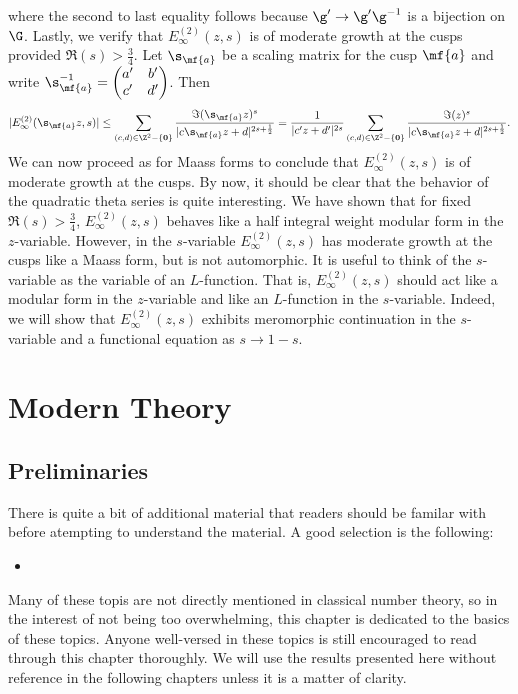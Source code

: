       where the second to last equality follows because $\g' \to \g'\g^{-1}$ is a bijection on $\G$. Lastly, we verify that $E_{\infty}^{(2)}(z,s)$ is of moderate growth at the cusps provided $\Re(s) > \frac{3}{4}$. Let $\s_{\mf{a}}$ be a scaling matrix for the cusp $\mf{a}$ and write $\s_{\mf{a}}^{-1} = \begin{pmatrix} a' & b' \\ c' & d' \end{pmatrix}$. Then
      \[
        |E_{\infty}^{(2)}(\s_{\mf{a}}z,s)| \le \sum_{(c,d) \in \Z^{2}-\{\mathbf{0}\}}\frac{\Im(\s_{\mf{a}}z)^{s}}{|c\s_{\mf{a}}z+d|^{2s+\frac{1}{2}}} = \frac{1}{|c'z+d'|^{2s}}\sum_{(c,d) \in \Z^{2}-\{\mathbf{0}\}}\frac{\Im(z)^{s}}{|c\s_{\mf{a}}z+d|^{2s+\frac{1}{2}}}.
      \]
      We can now proceed as for Maass forms to conclude that $E_{\infty}^{(2)}(z,s)$ is of moderate growth at the cusps. By now, it should be clear that the behavior of the quadratic theta series is quite interesting. We have shown that for fixed $\Re(s) > \frac{3}{4}$, $E_{\infty}^{(2)}(z,s)$ behaves like a half integral weight modular form in the $z$-variable. However, in the $s$-variable $E_{\infty}^{(2)}(z,s)$ has moderate growth at the cusps like a Maass form, but is not automorphic. It is useful to think of the $s$-variable as the variable of an $L$-function. That is, $E_{\infty}^{(2)}(z,s)$ should act like a modular form in the $z$-variable and like an $L$-function in the $s$-variable. Indeed, we will show that $E_{\infty}^{(2)}(z,s)$ exhibits meromorphic continuation in the $s$-variable and a functional equation as $s \to 1-s$.
    \section{}
\part{Modern Theory}
  \chapter{Preliminaries}
    There is quite a bit of additional material that readers should be familar with before atempting to understand the material. A good selection is the following:
    \begin{itemize}
      \item {}
    \end{itemize}
    Many of these topis are not directly mentioned in classical number theory, so in the interest of not being too overwhelming, this chapter is dedicated to the basics of these topics. Anyone well-versed in these topics is still encouraged to read through this chapter thoroughly. We will use the results presented here without reference in the following chapters unless it is a matter of clarity.
